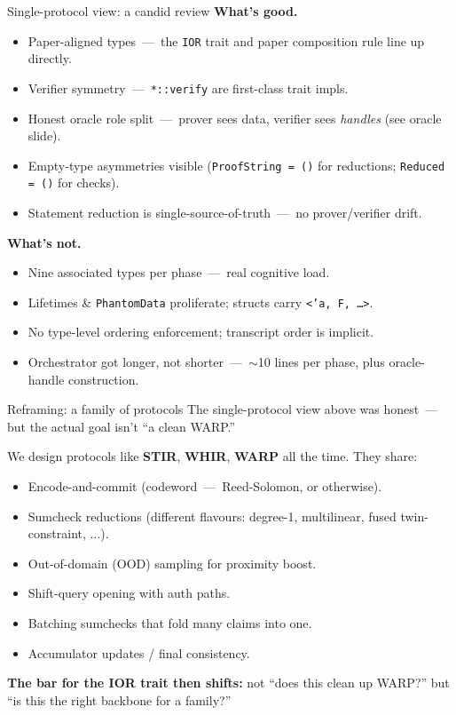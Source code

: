 \documentclass[10pt,aspectratio=169]{beamer}
\begin{document}
\begin{frame}{Single-protocol view: a candid review}
\small
\textbf{What's good.}
\begin{itemize}\small
  \item Paper-aligned types \,---\, the \texttt{IOR} trait and paper composition rule line up directly.
  \item Verifier symmetry \,---\, \texttt{*::verify} are first-class trait impls.
  \item Honest oracle role split \,---\, prover sees data, verifier sees \emph{handles} (see oracle slide).
  \item Empty-type asymmetries visible (\texttt{ProofString = ()} for reductions; \texttt{Reduced = ()} for checks).
  \item Statement reduction is single-source-of-truth \,---\, no prover/verifier drift.
\end{itemize}

\vspace{0.4em}
\textbf{What's not.}
\begin{itemize}\small
  \item Nine associated types per phase \,---\, real cognitive load.
  \item Lifetimes \& \texttt{PhantomData} proliferate; structs carry \texttt{<'a, F, \dots>}.
  \item No type-level ordering enforcement; transcript order is implicit.
  \item Orchestrator got longer, not shorter \,---\, $\sim$10 lines per phase, plus oracle-handle construction.
\end{itemize}
\end{frame}

\begin{frame}{Reframing: a family of protocols}
The single-protocol view above was honest \,---\, but the actual goal isn't ``a clean WARP.''

\vspace{0.4em}
We design protocols like \textbf{STIR}, \textbf{WHIR}, \textbf{WARP} all the time. They share:
\begin{itemize}\small
  \item Encode-and-commit (codeword \,---\, Reed-Solomon, or otherwise).
  \item Sumcheck reductions (different flavours: degree-1, multilinear, fused twin-constraint, $\dots$).
  \item Out-of-domain (OOD) sampling for proximity boost.
  \item Shift-query opening with auth paths.
  \item Batching sumchecks that fold many claims into one.
  \item Accumulator updates / final consistency.
\end{itemize}

\vspace{0.4em}
\textbf{The bar for the IOR trait then shifts:} not ``does this clean up WARP?'' but ``is this the right backbone for a family?''
\end{frame}
\end{document}
